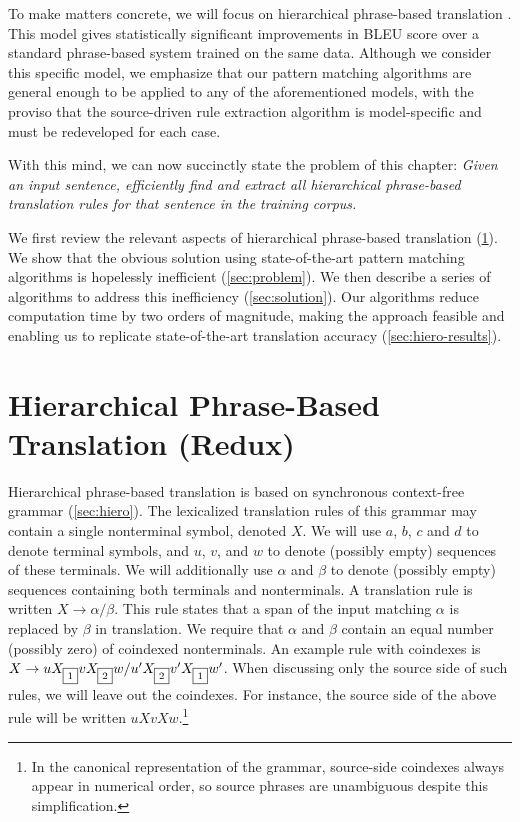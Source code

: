 To make matters concrete, we will focus on hierarchical phrase-based
translation \citep[\textsection\ref{sec:hiero}]{Chiang:2005:acl,Chiang:2007:cl}.  This model gives
statistically significant improvements in BLEU score over a standard 
phrase-based system trained on the same data.  Although we 
consider this specific model, we emphasize
that our pattern matching algorithms are general enough to be
applied to any of the aforementioned models, with the proviso that the
source-driven rule extraction algorithm is model-specific and must
be redeveloped for each case.

With this mind, we can now succinctly state the problem of this
chapter: {\em Given an input sentence, efficiently find and extract
all hierarchical phrase-based translation rules for that 
sentence in the training corpus.}

We first review the relevant aspects of 
hierarchical phrase-based translation
(\textsection\ref{sec:hierarchical-translation}).  
We show that the obvious solution using 
state-of-the-art pattern matching algorithms is 
hopelessly inefficient (\textsection\ref{sec:problem}).  We then describe a series 
of algorithms to address this inefficiency (\textsection\ref{sec:solution}).
Our algorithms reduce computation time by two orders of magnitude, making
the approach feasible and enabling us to replicate state-of-the-art
translation accuracy (\textsection\ref{sec:hiero-results}).


\section{Hierarchical Phrase-Based Translation (Redux)}\label{sec:hierarchical-translation}

\setlength{\fboxsep}{1pt}
\newcommand{\nt}[2]{#1_{\framebox{\scriptsize #2}}}

Hierarchical phrase-based 
translation is based on synchronous context-free grammar
(\textsection\ref{sec:hiero}).  The lexicalized translation rules of
this grammar may contain a single nonterminal symbol, denoted $X$.  
We will use $a$, $b$, $c$ and $d$ to denote terminal symbols, and $u$,
$v$, and $w$ to denote (possibly empty) sequences of these terminals.
We will additionally use $\alpha$ and $\beta$ to denote
(possibly empty) sequences containing both terminals and nonterminals.
A translation rule is written $X \rightarrow \alpha / \beta$.
This rule states that a span of the input matching $\alpha$ is replaced
by $\beta$ in translation.  We require that $\alpha$ and $\beta$ contain
an equal number (possibly zero) of coindexed nonterminals.  
An example rule with coindexes is
$X \rightarrow u\nt{X}{1}v\nt{X}{2}w / u'\nt{X}{2}v'\nt{X}{1}w'$.  When
discussing only the source side of such rules, we will leave out
the coindexes.  For instance, the source side of the above rule will be written
$uXvXw$.\footnote{In the canonical representation of the grammar,
source-side coindexes always appear in numerical order, so source phrases
are unambiguous despite this simplification.}

